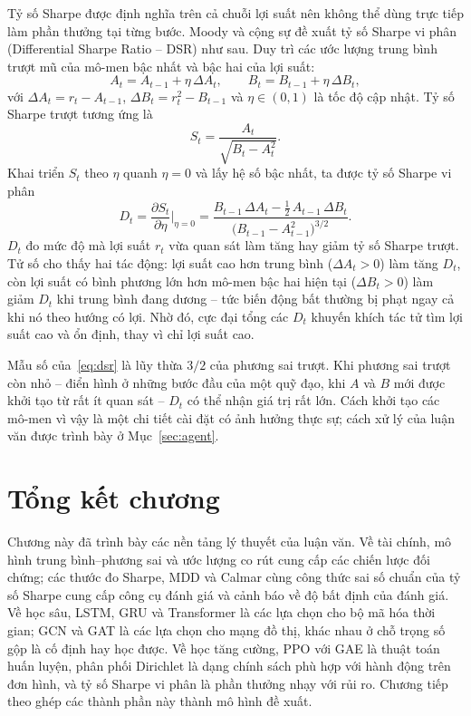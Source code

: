 Tỷ số Sharpe được định nghĩa trên cả chuỗi lợi suất nên không thể dùng trực tiếp làm phần thưởng tại từng bước. Moody và cộng sự \cite{moody1998,moody2001} đề xuất tỷ số Sharpe vi phân (Differential Sharpe Ratio -- DSR) như sau. Duy trì các ước lượng trung bình trượt mũ của mô-men bậc nhất và bậc hai của lợi suất:
\begin{equation}
A_t=A_{t-1}+\eta\,\Delta A_t,\qquad B_t=B_{t-1}+\eta\,\Delta B_t,
\label{eq:dsr-ab}
\end{equation}
với $\Delta A_t=r_t-A_{t-1}$, $\Delta B_t=r_t^2-B_{t-1}$ và $\eta\in(0,1)$ là tốc độ cập nhật. Tỷ số Sharpe trượt tương ứng là
\begin{equation}
S_t=\frac{A_t}{\sqrt{B_t-A_t^2}} .
\label{eq:dsr-s}
\end{equation}
Khai triển $S_t$ theo $\eta$ quanh $\eta=0$ và lấy hệ số bậc nhất, ta được tỷ số Sharpe vi phân
\begin{equation}
D_t=\frac{\partial S_t}{\partial\eta}\Big|_{\eta=0}=\frac{B_{t-1}\,\Delta A_t-\tfrac12\,A_{t-1}\,\Delta B_t}{\big(B_{t-1}-A_{t-1}^2\big)^{3/2}} .
\label{eq:dsr}
\end{equation}
$D_t$ đo mức độ mà lợi suất $r_t$ vừa quan sát làm tăng hay giảm tỷ số Sharpe trượt. Tử số cho thấy hai tác động: lợi suất cao hơn trung bình ($\Delta A_t>0$) làm tăng $D_t$, còn lợi suất có bình phương lớn hơn mô-men bậc hai hiện tại ($\Delta B_t>0$) làm giảm $D_t$ khi trung bình đang dương -- tức biến động bất thường bị phạt ngay cả khi nó theo hướng có lợi. Nhờ đó, cực đại tổng các $D_t$ khuyến khích tác tử tìm lợi suất cao và ổn định, thay vì chỉ lợi suất cao.

Mẫu số của~\eqref{eq:dsr} là lũy thừa $3/2$ của phương sai trượt. Khi phương sai trượt còn nhỏ -- điển hình ở những bước đầu của một quỹ đạo, khi $A$ và $B$ mới được khởi tạo từ rất ít quan sát -- $D_t$ có thể nhận giá trị rất lớn. Cách khởi tạo các mô-men vì vậy là một chi tiết cài đặt có ảnh hưởng thực sự; cách xử lý của luận văn được trình bày ở Mục~\ref{sec:agent}.

\section{Tổng kết chương}

Chương này đã trình bày các nền tảng lý thuyết của luận văn. Về tài chính, mô hình trung bình--phương sai và ước lượng co rút cung cấp các chiến lược đối chứng; các thước đo Sharpe, MDD và Calmar cùng công thức sai số chuẩn của tỷ số Sharpe cung cấp công cụ đánh giá và cảnh báo về độ bất định của đánh giá. Về học sâu, LSTM, GRU và Transformer là các lựa chọn cho bộ mã hóa thời gian; GCN và GAT là các lựa chọn cho mạng đồ thị, khác nhau ở chỗ trọng số gộp là cố định hay học được. Về học tăng cường, PPO với GAE là thuật toán huấn luyện, phân phối Dirichlet là dạng chính sách phù hợp với hành động trên đơn hình, và tỷ số Sharpe vi phân là phần thưởng nhạy với rủi ro. Chương tiếp theo ghép các thành phần này thành mô hình đề xuất.
